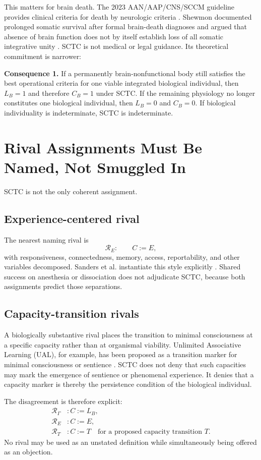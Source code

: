 This matters for brain death. The 2023 AAN/AAP/CNS/SCCM guideline provides clinical criteria for death by neurologic criteria \cite{Greer2023}. Shewmon documented prolonged somatic survival after formal brain-death diagnoses and argued that absence of brain function does not by itself establish loss of all somatic integrative unity \cite{Shewmon1998}. SCTC is not medical or legal guidance. Its theoretical commitment is narrower:

\textbf{Consequence 1.} If a permanently brain-nonfunctional body still satisfies the best operational criteria for one viable integrated biological individual, then $L_B=1$ and therefore $C_B=1$ under SCTC. If the remaining physiology no longer constitutes one biological individual, then $L_B=0$ and $C_B=0$. If biological individuality is indeterminate, SCTC is indeterminate.

\section{Rival Assignments Must Be Named, Not Smuggled In}
SCTC is not the only coherent assignment.

\subsection{Experience-centered rival}
The nearest naming rival is
\begin{equation}
\mathcal R_E:\qquad C:=E,
\end{equation}
with responsiveness, connectedness, memory, access, reportability, and other variables decomposed. Sanders et al. instantiate this style explicitly \cite{Sanders2012}. Shared success on anesthesia or dissociation does not adjudicate SCTC, because both assignments predict those separations.

\subsection{Capacity-transition rivals}
A biologically substantive rival places the transition to minimal consciousness at a specific capacity rather than at organismal viability. Unlimited Associative Learning (UAL), for example, has been proposed as a transition marker for minimal consciousness or sentience \cite{Bronfman2016,Birch2020}. SCTC does not deny that such capacities may mark the emergence of sentience or phenomenal experience. It denies that a capacity marker is thereby the persistence condition of the biological individual.

The disagreement is therefore explicit:
\begin{align}
\mathcal R_\Gamma &: C:=L_B,\\
\mathcal R_E &: C:=E,\\
\mathcal R_T &: C:=T \quad\text{for a proposed capacity transition }T.
\end{align}
No rival may be used as an unstated definition while simultaneously being offered as an objection.

